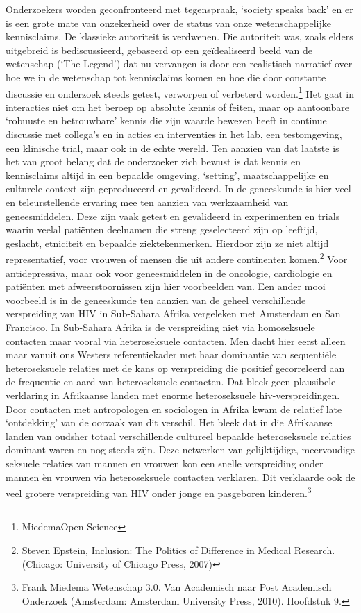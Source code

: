 \documentclass[empirical, authordate, ]{new-jote-article}
\begin{document}
	Onderzoekers worden geconfronteerd met tegenspraak, ‘society speaks back' en er is een grote mate van onzekerheid over de status van onze wetenschappelijke kennisclaims. De klassieke autoriteit is verdwenen. Die autoriteit was, zoals elders uitgebreid is bediscussieerd, gebaseerd op een geïdealiseerd beeld van de wetenschap (‘The Legend') dat nu vervangen is door een realistisch narratief over hoe we in de wetenschap tot kennisclaims komen en hoe die door constante discussie en onderzoek steeds getest, verworpen of verbeterd worden.\footnote{MiedemaOpen Science} Het gaat in interacties niet om het beroep op absolute kennis of feiten, maar op aantoonbare ‘robuuste en betrouwbare' kennis die zijn waarde bewezen heeft in continue discussie met collega's en in acties en interventies in het lab, een testomgeving, een klinische trial, maar ook in de echte wereld. Ten aanzien van dat laatste is het van groot belang dat de onderzoeker zich bewust is dat kennis en kennisclaims altijd in een bepaalde omgeving, ‘setting', maatschappelijke en culturele context zijn geproduceerd en gevalideerd. In de geneeskunde is hier veel en teleurstellende ervaring mee ten aanzien van werkzaamheid van geneesmiddelen. Deze zijn vaak getest en gevalideerd in experimenten en trials waarin veelal patiënten deelnamen die streng geselecteerd zijn op leeftijd, geslacht, etniciteit en bepaalde ziektekenmerken. Hierdoor zijn ze niet altijd representatief, voor vrouwen of mensen die uit andere continenten komen.\footnote{Steven Epstein, Inclusion: The Politics of Difference in Medical Research. (Chicago: University of Chicago Press, 2007)} Voor antidepressiva, maar ook voor geneesmiddelen in de oncologie, cardiologie en patiënten met afweerstoornissen zijn hier voorbeelden van. Een ander mooi voorbeeld is in de geneeskunde ten aanzien van de geheel verschillende verspreiding van HIV in Sub-Sahara Afrika vergeleken met Amsterdam en San Francisco. In Sub-Sahara Afrika is de verspreiding niet via homoseksuele contacten maar vooral via heteroseksuele contacten. Men dacht hier eerst alleen maar vanuit ons Westers referentiekader met haar dominantie van sequentiële heteroseksuele relaties met de kans op verspreiding die positief gecorreleerd aan de frequentie en aard van heteroseksuele contacten. Dat bleek geen plausibele verklaring in Afrikaanse landen met enorme heteroseksuele hiv-verspreidingen. Door contacten met antropologen en sociologen in Afrika kwam de relatief late ‘ontdekking' van de oorzaak van dit verschil. Het bleek dat in die Afrikaanse landen van oudsher totaal verschillende cultureel bepaalde heteroseksuele relaties dominant waren en nog steeds zijn. Deze netwerken van gelijktijdige, meervoudige seksuele relaties van mannen en vrouwen kon een snelle verspreiding onder mannen èn vrouwen via heteroseksuele contacten verklaren. Dit verklaarde ook de veel grotere verspreiding van HIV onder jonge en pasgeboren kinderen.\footnote{Frank Miedema Wetenschap 3.0. Van Academisch naar Post Academisch Onderzoek (Amsterdam: Amsterdam University Press, 2010). Hoofdstuk 9. }
\end{document}
